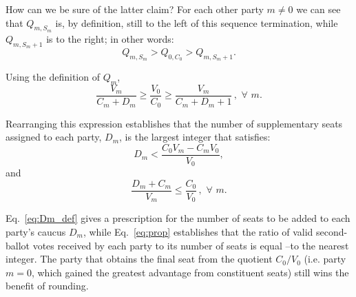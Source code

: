 \documentclass[DIV=calc, paper=a4, fontsize=11pt, twocolumn]{scrartcl}	 %
\begin{document}
How can we be sure of the latter claim? For each other party $m\neq 0$ we can see that $Q_{m,S_{m}}$ is, by definition, still to the left of this sequence termination, while $Q_{m,S_{m}+1}$ is to the right; in other words:
\begin{equation}
\label{eq:Qm_cutoff}
Q_{m,S_{m}}  > Q_{0,C_0} > Q_{m,S_{m}+1}. 
\end{equation}

Using the definition of $Q_m$, 
\begin{equation}
\label{eq:Sm_cutoff}
\frac{V_{m}}{C_{m}+D_m} \ge \frac{V_{0}}{C_0} \ge \frac{V_{m}}{C_{m}+D_m+1}\, , \,\, \forall \,\,  m. 
\end{equation}

Rearranging this expression establishes that the number of supplementary seats assigned to each party, $D_m$, is the largest integer that satisfies:
\begin{equation}
\label{eq:Dm_def}
D_m < \frac{ C_0 V_m - C_m V_0}{V_0},
\end{equation}
and
\begin{equation}
\label{eq:prop}
\frac{D_{m}+C_m}{V_{m}} \le \frac{C_0}{V_0} \, , \,\, \forall \,\, m. 
\end{equation}

Eq.~\ref{eq:Dm_def} gives a prescription for the number of seats to be added to each party's caucus $D_m$, while Eq.~\ref{eq:prop} establishes that the ratio of valid second-ballot votes received by each party to its number of seats is equal \---to the nearest integer. The party that obtains the final seat from the quotient $C_0/V_0$ (i.e. party $m=0$, which gained the greatest advantage from constituent seats) still wins the benefit of rounding.
\end{document}
